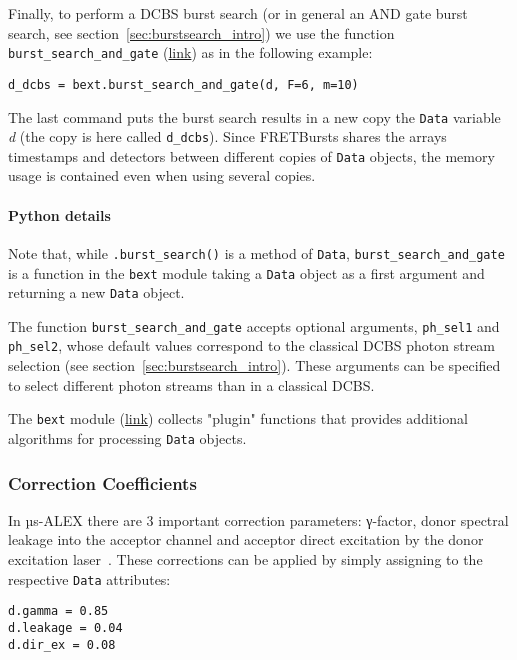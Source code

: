 Finally, to perform a DCBS burst search (or in general an AND gate burst search,
see section~\ref{sec:burstsearch_intro}) we use the function
\verb|burst_search_and_gate|
(\href{http://fretbursts.readthedocs.org/en/latest/plugins.html#fretbursts.burstlib_ext.burst_search_and_gate}{link})
as in the following example:

\begin{lstlisting}
d_dcbs = bext.burst_search_and_gate(d, F=6, m=10)
\end{lstlisting}

The last command puts the burst search results in a new copy the \verb|Data| variable \textit{d}
(the copy is here called \verb|d_dcbs|).
Since FRETBursts shares the arrays timestamps and detectors between
different copies of \verb|Data| objects, the memory usage is contained even when using 
several copies. 

\paragraph{Python details}
Note that, while \verb|.burst_search()| is a method of \verb|Data|,
\verb|burst_search_and_gate| is a function in the \verb|bext| module
taking a \verb|Data| object as a first argument and returning a new
\verb|Data| object.

The function \verb|burst_search_and_gate| accepts optional arguments,
\verb|ph_sel1| and \verb|ph_sel2|, whose default values correspond to the
classical DCBS photon stream selection (see section~\ref{sec:burstsearch_intro}).
These arguments can be specified to select different photon streams than in
a classical DCBS.

The \verb|bext| module (\href{http://fretbursts.readthedocs.org/en/latest/plugins.html}{link}) 
collects "plugin" functions that provides additional algorithms 
for processing \verb|Data| objects. 

\subsubsection{Correction Coefficients}
\label{sec:corrcoeff}

In µs-ALEX there are 3 important correction parameters: γ-factor, donor spectral
leakage into the acceptor channel and acceptor direct excitation by the donor excitation
laser~\cite{Lee_2005}.
These corrections can be applied by simply assigning to the respective \verb|Data| attributes:

\begin{lstlisting}
d.gamma = 0.85
d.leakage = 0.04
d.dir_ex = 0.08
\end{lstlisting}

